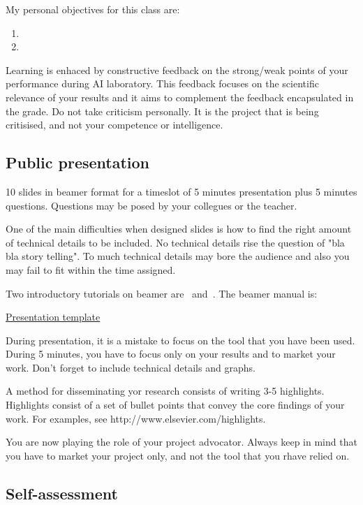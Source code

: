 \documentclass[a4paper,12pt]{report}
\begin{document}
\vspace{0.5cm}

My personal objectives for this class are:
\begin{enumerate}
 \item 
 \item 
\end{enumerate}

Learning is enhaced by constructive feedback on the strong/weak points of your performance during AI laboratory. 
This feedback focuses on the scientific relevance of your results and it aims to complement the feedback encapsulated in the grade.
Do not take criticism personally. 
It is the project that is being critisised, and not your competence or intelligence. 


\subsection{Public presentation}
10 slides in beamer format for a timeslot of 5 minutes presentation plus 5 minutes questions.
Questions may be posed by your collegues or the teacher. 

One of the main difficulties when designed slides is how to find the right amount of 
technical details to be included. 
No technical details rise the question of "bla bla story telling". 
To much technical details may bore the audience and also you may fail to fit within the time assigned. 

Two introductory tutorials on beamer are~\cite{mertz2005beamer} and~\cite{batts2007beamer}.
The beamer manual is: 

\href{http://cs-gw.utcluj.ro/~srazvan/articleSchema.tgz}{Presentation template}

During presentation, it is a mistake to focus on the tool that you have been used. 
During 5 minutes, you have to focus only on your results and to market your work.
Don't forget to include technical details and graphs.

A method for disseminating yor research consists of writing 3-5 highlights.
Highlights consist of a set of bullet points 
that convey the core findings of your work.
For examples, see http://www.elsevier.com/highlights.

You are now playing the role of your project advocator. 
Always keep in mind that you have to market your project only, and not the tool that you rhave relied on.



\subsection{Self-assessment}
\end{document}
